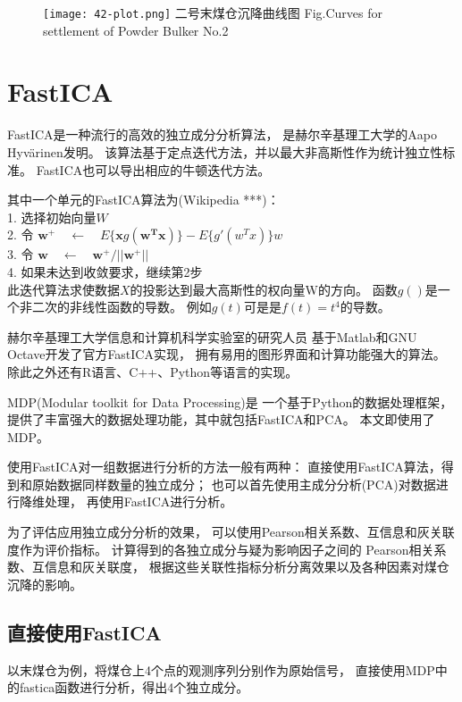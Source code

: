 \begin{figure}[!htbp]
   \centering
   \texttt{[image: 42-plot.png]}
				    {二号末煤仓沉降曲线图}
			{Fig.}{Curves for settlement of Powder Bulker No.2}
\end{figure}
\newpage

\section{FastICA}
FastICA是一种流行的高效的独立成分分析算法，
是赫尔辛基理工大学的Aapo Hyvärinen发明。
该算法基于定点迭代方法，并以最大非高斯性作为统计独立性标准。
FastICA也可以导出相应的牛顿迭代方法。

其中一个单元的FastICA算法为(Wikipedia ***)：\\
	1. 选择初始向量$W$ \\
	2. 令 $\bm{w}^{+} \quad \leftarrow 
			\quad E\{\bm{x}g(\bm{w^Tx})\} - E\{g'(w^Tx)\}w$ \\
	3. 令 $\bm{w} \quad \leftarrow \quad 
			\bm{w}^{+}/||\bm{w}^{+}||$ \\
	4. 如果未达到收敛要求，继续第2步 \\
此迭代算法求使数据$X$的投影达到最大高斯性的权向量W的方向。
函数$g()$是一个非二次的非线性函数的导数。
例如$g(t)$可是是$f(t)=t^4$的导数。

赫尔辛基理工大学信息和计算机科学实验室的研究人员
基于Matlab和GNU Octave开发了官方FastICA实现，
拥有易用的图形界面和计算功能强大的算法。
除此之外还有R语言、C++、Python等语言的实现。

MDP(Modular toolkit for Data Processing)是
一个基于Python的数据处理框架，
提供了丰富强大的数据处理功能，其中就包括FastICA和PCA。
本文即使用了MDP。

使用FastICA对一组数据进行分析的方法一般有两种：
直接使用FastICA算法，得到和原始数据同样数量的独立成分；
也可以首先使用主成分分析(PCA)对数据进行降维处理，
再使用FastICA进行分析。   

为了评估应用独立成分分析的效果，
可以使用Pearson相关系数、互信息和灰关联度作为评价指标。
计算得到的各独立成分与疑为影响因子之间的
Pearson相关系数、互信息和灰关联度，
根据这些关联性指标分析分离效果以及各种因素对煤仓沉降的影响。

\subsection{直接使用FastICA}
以末煤仓为例，将煤仓上4个点的观测序列分别作为原始信号，
直接使用MDP中的fastica函数进行分析，得出4个独立成分。

